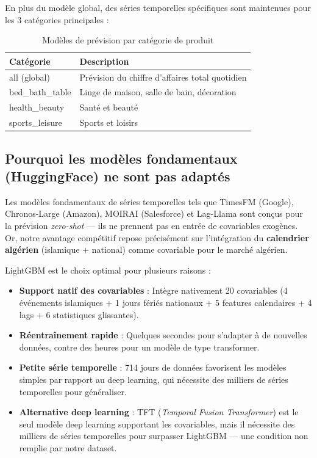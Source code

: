\documentclass[12pt,a4paper]{report}
\begin{document}
En plus du mod\`{e}le global, des s\'{e}ries temporelles sp\'{e}cifiques sont maintenues pour les 3 cat\'{e}gories principales :

\begin{table}[H]
\centering
\caption{Mod\`{e}les de pr\'{e}vision par cat\'{e}gorie de produit}
\label{tab:forecast_cats}
\begin{tabularx}{\textwidth}{l X}
\toprule
\textbf{Cat\'{e}gorie} & \textbf{Description} \\
\midrule
all (global) & Pr\'{e}vision du chiffre d'affaires total quotidien \\
bed\_bath\_table & Linge de maison, salle de bain, d\'{e}coration \\
health\_beauty & Sant\'{e} et beaut\'{e} \\
sports\_leisure & Sports et loisirs \\
\bottomrule
\end{tabularx}
\end{table}

\subsection{Pourquoi les mod\`{e}les fondamentaux (HuggingFace) ne sont pas adapt\'{e}s}

Les mod\`{e}les fondamentaux de s\'{e}ries temporelles tels que TimesFM (Google), Chronos-Large (Amazon), MOIRAI (Salesforce) et Lag-Llama sont con\c{c}us pour la pr\'{e}vision \textit{zero-shot} --- ils ne prennent pas en entr\'{e}e de covariables exog\`{e}nes. Or, notre avantage comp\'{e}titif repose pr\'{e}cis\'{e}ment sur l'int\'{e}gration du \textbf{calendrier alg\'{e}rien} (islamique + national) comme covariable pour le march\'{e} alg\'{e}rien.

LightGBM est le choix optimal pour plusieurs raisons :

\begin{itemize}
  \item \textbf{Support natif des covariables} : Int\`{e}gre nativement 20 covariables (4 \'{e}v\'{e}nements islamiques + 1 jours f\'{e}ri\'{e}s nationaux + 5 features calendaires + 4 lags + 6 statistiques glissantes).
  \item \textbf{R\'{e}entra\^{i}nement rapide} : Quelques secondes pour s'adapter \`{a} de nouvelles donn\'{e}es, contre des heures pour un mod\`{e}le de type transformer.
  \item \textbf{Petite s\'{e}rie temporelle} : 714 jours de donn\'{e}es favorisent les mod\`{e}les simples par rapport au deep learning, qui n\'{e}cessite des milliers de s\'{e}ries temporelles pour g\'{e}n\'{e}raliser.
  \item \textbf{Alternative deep learning} : TFT (\textit{Temporal Fusion Transformer}) est le seul mod\`{e}le deep learning supportant les covariables, mais il n\'{e}cessite des milliers de s\'{e}ries temporelles pour surpasser LightGBM --- une condition non remplie par notre dataset.
\end{itemize}
\end{document}
